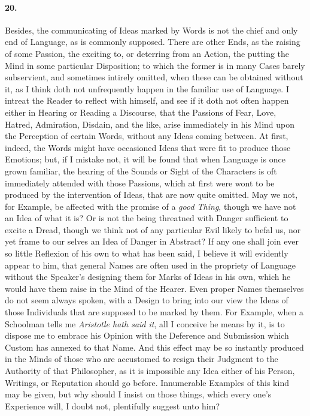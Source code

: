 \documentclass[]{article}
\newenvironment{sectionbody}{\begin{multicols}{2}}{\end{multicols}}
\begin{document}
\begin{sectionbody}
\paragraph{20.} Besides, the communicating of Ideas marked by Words is not the
chief and only end of Language, as is commonly supposed.  There
are other Ends, as the raising of some Passion, the exciting to,
or deterring from an Action, the putting the Mind in some
particular Disposition; to which the former is in many Cases
barely subservient, and sometimes intirely omitted, when these
can be obtained without it, as I think doth not unfrequently
happen in the familiar use of Language.  I intreat the Reader to
reflect with himself, and see if it doth not often happen either
in Hearing or Reading a Discourse, that the Passions of Fear,
Love, Hatred, Admiration, Disdain, and the like, arise
immediately in his Mind upon the Perception of certain Words,
without any Ideas coming between.  At first, indeed, the Words
might have occasioned Ideas that were fit to produce those
Emotions; but, if I mistake not, it will be found that when
Language is once grown familiar, the hearing of the Sounds or
Sight of the Characters is oft immediately attended with those
Passions, which at first were wont to be produced by the
intervention of Ideas, that are now quite omitted.  May we not,
for Example, be affected with the promise of a \emph{good
Thing}, though we have not an Idea of what it is? Or is not
the being threatned with Danger sufficient to excite a Dread,
though we think not of any particular Evil likely to befal us,
nor yet frame to our selves an Idea of Danger in Abstract? If any
one shall join ever so little Reflexion of his own to what has
been said, I believe it will evidently appear to him, that
general Names are often used in the propriety of Language without
the Speaker's designing them for Marks of Ideas in his own, which
he would have them raise in the Mind of the Hearer.  Even proper
Names themselves do not seem always spoken, with a Design to
bring into our view the Ideas of those Individuals that are
supposed to be marked by them.  For Example, when a Schoolman
tells me \emph{Aristotle hath said it}, all I conceive he means
by it, is to dispose me to embrace his Opinion with the Deference
and Submission which Custom has annexed to that Name.  And this
effect may be so instantly produced in the Minds of those who are
accustomed to resign their Judgment to the Authority of that
Philosopher, as it is impossible any Idea either of his Person,
Writings, or Reputation should go before.  Innumerable Examples
of this kind may be given, but why should I insist on those
things, which every one's Experience will, I doubt not,
plentifully suggest unto him?




\end{sectionbody}
\end{document}
